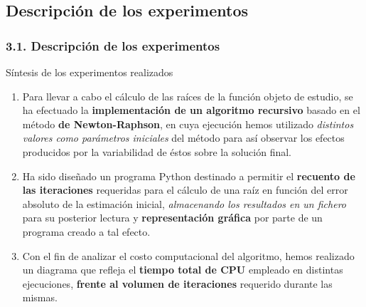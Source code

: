 \documentclass{beamer}
\begin{document}
\subsection{Descripción de los experimentos}
\begin{frame}
\frametitle{3.1. Descripción de los experimentos}
\begin{block}{Síntesis de los experimentos realizados}

    \begin{enumerate}
      \item
        Para llevar a cabo el cálculo de las raíces de la función objeto de estudio,
        se ha efectuado la \textbf{implementación de un algoritmo recursivo} basado 
        en el método \textbf{de Newton-Raphson}, en cuya ejecución hemos utilizado 
        \emph{distintos valores como parámetros iniciales} del método para así observar 
        los efectos producidos por la variabilidad de éstos sobre la solución final. 
        \pause
        \vspace*{-1mm}
      \item
        Ha sido diseñado un programa Python destinado a permitir el \textbf{recuento de 
        las iteraciones} requeridas para el cálculo de una raíz en función del error absoluto
        de la estimación inicial, \emph{almacenando los resultados en un fichero} para su 
        posterior lectura y \textbf{representación gráfica} por parte de un programa creado 
        a tal efecto.
        \pause
        \vspace*{-1mm}
      \item
        Con el fin de analizar el costo computacional del algoritmo, hemos realizado un
        diagrama que refleja el \textbf{tiempo total de CPU} empleado en distintas ejecuciones, 
        \textbf{frente al volumen de iteraciones} requerido durante las mismas.
    \end{enumerate}

\end{block}
\end{frame}

\end{document}

